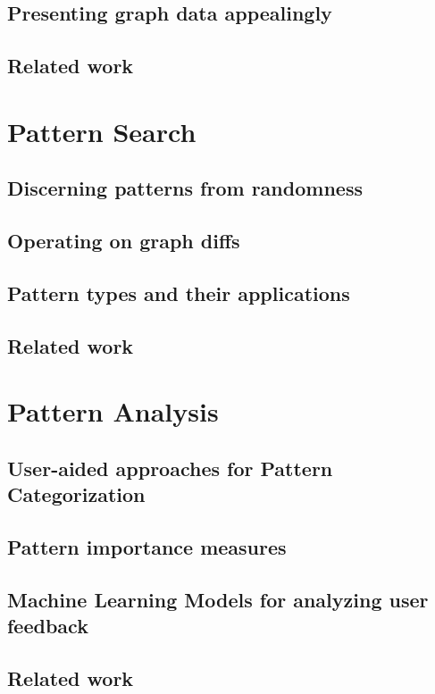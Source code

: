 \documentclass[
        a4paper,     %
        titlepage,   %
        twoside,     %
        parskip      %
        ]{scrartcl}  %
\begin{document}
    \subsection{Presenting graph data appealingly}
    \subsection{Related work}
    \pagebreak

  \section{Pattern Search}
    \subsection{Discerning patterns from randomness}
    \subsection{Operating on graph diffs}
    \subsection{Pattern types and their applications}
    \subsection{Related work}
    \pagebreak

  \section{Pattern Analysis}
    \subsection{User-aided approaches for Pattern Categorization}
    \subsection{Pattern importance measures}
    \subsection{Machine Learning Models for analyzing user feedback}
    \subsection{Related work}
    \pagebreak
\end{document}
